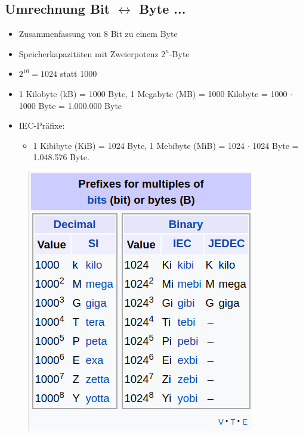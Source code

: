 \documentclass[xcolor=dvipsnames]{beamer}
\begin{document}
\subsection{Umrechnung Bit $\leftrightarrow$ Byte ...}
\begin{frame}
\begin{itemize}
	\item Zusammenfassung von 8 Bit zu einem Byte
	\item Speicherkapazitäten mit Zweierpotenz $2^n$-Byte
	\item $2^{10} = 1024$ statt 1000
	\item 1 Kilobyte (kB) = 1000 Byte, 1 Megabyte (MB) = 1000 Kilobyte = 1000 $\cdot$ 1000 Byte = 1.000.000 Byte
	\item IEC-Präfixe:
	\begin{itemize}
		\item 1 Kibibyte (KiB) = 1024 Byte, 1 Mebibyte (MiB) = 1024 $\cdot$ 1024 Byte = 1.048.576 Byte.
	\end{itemize}
\end{itemize}
\end{frame}

\begin{frame}
\begin{figure}
\centering
\includegraphics[scale=0.54]{bit-byte}
\end{figure}
\end{frame}
\end{document}
